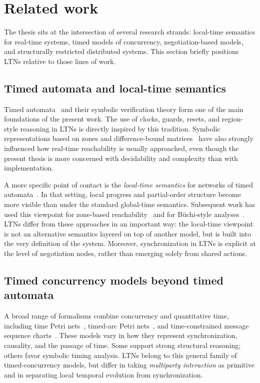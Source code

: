 
\section{Related work}
\label{sec:intro-related}

The thesis sits at the intersection of several research strands: local-time semantics for real-time systems, timed models of concurrency, negotiation-based models, and structurally restricted distributed systems. This section briefly positions LTNs relative to those lines of work.

\subsection{Timed automata and local-time semantics}

Timed automata~\cite{AlurDillTA} and their symbolic verification theory form one of the main foundations of the present work. The use of clocks, guards, resets, and region-style reasoning in LTNs is directly inspired by this tradition. Symbolic representations based on zones and difference-bound matrices~\cite{DillPhD} have also strongly influenced how real-time reachability is usually approached, even though the present thesis is more concerned with decidability and complexity than with implementation.

A more specific point of contact is the \emph{local-time semantics} for networks of timed automata~\cite{LocalTimeTA}. In that setting, local progress and partial-order structure become more visible than under the standard global-time semantics. Subsequent work has used this viewpoint for zone-based reachability~\cite{LocalZone1,LocalZone2} and for B\"uchi-style analyses~\cite{LocalBuchi}. LTNs differ from these approaches in an important way: the local-time viewpoint is not an alternative semantics layered on top of another model, but is built into the very definition of the system. Moreover, synchronization in LTNs is explicit at the level of negotiation nodes, rather than emerging solely from shared actions.

\subsection{Timed concurrency models beyond timed automata}

A broad range of formalisms combine concurrency and quantitative time, including time Petri nets~\cite{MerlinTimePN}, timed-arc Petri nets~\cite{HansenTimedArc}, and time-constrained message sequence charts~\cite{AlurMSC}. These models vary in how they represent synchronization, causality, and the passage of time. Some support strong structural reasoning; others favor symbolic timing analysis. LTNs belong to this general family of timed-concurrency models, but differ in taking \emph{multiparty interaction} as primitive and in separating local temporal evolution from synchronization.

